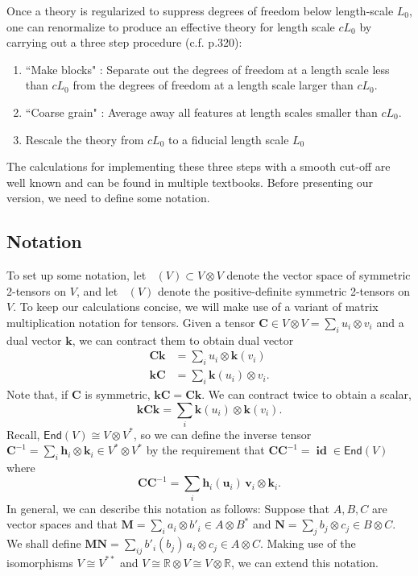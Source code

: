 \documentclass[12pt]{article}
\theoremstyle{definition}
\theoremstyle{plain}
\newcommand{\Sym}{\mathop{\mathrm{Sym}_2}}
\newcommand{\Symp}{\mathop{\mathrm{Sym}_2^+}}
\newcommand{\id}{\mathop{\mathbf{id}}\nolimits}
\begin{document}
Once a theory is regularized to suppress degrees of freedom below length-scale $L_0$, one can renormalize to produce an effective theory for length scale \(cL_0\) by carrying out a three step procedure (c.f. \cite{huang2010quantum} p.320):

\begin{enumerate} \label{threeSteps}
    \item ``Make blocks" : Separate out the degrees of freedom at a length scale less than \(cL_0\) from the degrees of freedom at a length scale larger than \(cL_0\).
    \item ``Coarse grain" : Average away all features at length scales smaller than \(cL_0\).  
    \item Rescale the theory from \(cL_0\) to a fiducial length scale \(L_0\)
\end{enumerate}
The calculations for implementing these three steps with a smooth cut-off are well known and can be found in multiple textbooks.  Before presenting our version, we need to define some notation.

\subsection{Notation}\label{sec:notation}

To set up some notation, let $\Sym (V) \subset V \otimes V$ denote the vector space of symmetric 2-tensors on $V$, and let $\Symp (V)$ denote the positive-definite symmetric 2-tensors on $V$. 
To keep our calculations concise, we will make use of a variant of matrix multiplication notation for tensors.  
Given a tensor \(\mathbf{C} \in V \otimes V = \sum_i u_i \otimes v_i\) and a dual vector \(\mathbf{k}\), we can contract them to obtain dual vector
\begin{align}
    \mathbf{Ck} &= \sum_i u_i \otimes \mathbf{k} (v_i) \\
    \mathbf{kC} &= \sum_i \mathbf{k}(u_i) \otimes v_i.
\end{align}
Note that, if \(\mathbf{C}\) is symmetric, \(\mathbf{kC} = \mathbf{Ck}\).  We can contract twice to obtain a scalar,
\begin{equation}
    \mathbf{kCk} = \sum_i \mathbf{k} (u_i) \otimes \mathbf{k} (v_i).
\end{equation}
Recall, $\mathsf{End}(V) \cong V \otimes V^*$, so we can define the inverse tensor \(\mathbf{C}^{-1} = \sum_i \mathbf{h}_i \otimes \mathbf{k}_i \in V^* \otimes V^*\) by the requirement that 
\(\mathbf{C} \mathbf{C}^{-1} = \id \in \mathsf{End}(V)\) where
\begin{equation} \label{eq:inverseForms}
    \mathbf{C} \mathbf{C}^{-1} = \sum_i \mathbf{h}_i (\mathbf{u}_i) \, \mathbf{v}_i \otimes \mathbf{k}_i.
\end{equation}
In general, we can describe this notation as follows:
Suppose that \(A,B,C\) are vector spaces and that \(\mathbf{M} = \sum_i a_i \otimes b'_i \in A \otimes B^*\) and \(\mathbf{N} = \sum_j b_j \otimes c_j \in B \otimes C\).  We shall define \(\mathbf{MN} = \sum_{ij} b'_i (b_j) \, a_i \otimes c_j  \in A \otimes C\).  Making use of the isomorphisms \(V \cong V^{**}\) and \(V \cong \mathbb{R} \otimes V \cong V\otimes \mathbb{R}\), we can extend this notation. 
\end{document}
